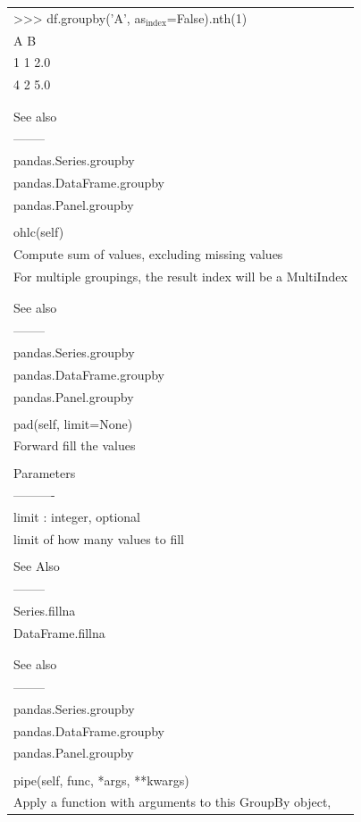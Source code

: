 \documentclass[11pt]{article}
\begin{document}
\begin{enumerate}
\begin{enumerate}
\begin{enumerate}
\begin{center}
\begin{tabular}{l}
\\
>>> df.groupby('A', as\(_{\text{index}}\)=False).nth(1)\\
A    B\\
1  1  2.0\\
4  2  5.0\\
\\
\\
See also\\
--------\\
pandas.Series.groupby\\
pandas.DataFrame.groupby\\
pandas.Panel.groupby\\
\\
ohlc(self)\\
Compute sum of values, excluding missing values\\
For multiple groupings, the result index will be a MultiIndex\\
\\
\\
See also\\
--------\\
pandas.Series.groupby\\
pandas.DataFrame.groupby\\
pandas.Panel.groupby\\
\\
pad(self, limit=None)\\
Forward fill the values\\
\\
Parameters\\
----------\\
limit : integer, optional\\
limit of how many values to fill\\
\\
See Also\\
--------\\
Series.fillna\\
DataFrame.fillna\\
\\
\\
See also\\
--------\\
pandas.Series.groupby\\
pandas.DataFrame.groupby\\
pandas.Panel.groupby\\
\\
pipe(self, func, *args, **kwargs)\\
Apply a function with arguments to this GroupBy object,\\

\end{tabular}
\end{center}
\end{enumerate}
\end{enumerate}
\end{enumerate}
\end{document}
